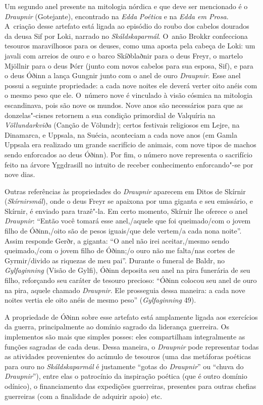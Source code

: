 Um segundo anel presente na mitologia nórdica e que deve ser mencionado
é o \emph{Draupnir} (Gotejante), encontrado na \emph{Edda}
\emph{Poética} e na \emph{Edda em Prosa}. A~criação desse artefato está
ligada ao episódio do roubo dos cabelos dourados da deusa Sif por Loki,
narrado no \emph{Skáldskaparmál}. O~anão Brokkr confecciona tesouros
maravilhosos para os deuses, como uma aposta pela cabeça de Loki: um
javali com arreios de ouro e o barco Skíðblaðnir para o deus Freyr, o
martelo Mjöllnir para o deus Þórr (junto com novos cabelos para sua
esposa, Sif), e para o deus Óðinn a lança Gungnir junto com o anel de
ouro \emph{Draupnir}. Esse anel possui a seguinte propriedade: a cada
nove noites ele deverá verter oito anéis com o mesmo peso que ele.
O~número nove é vinculado à visão cósmica na mitologia escandinava, pois
são nove os mundos. Nove anos são necessários para que as
donzelas"-cisnes retornem a sua condição primordial de Valquíria na
\emph{Völlundarkviða} (Canção de Völundr); certos festivais religiosos
em Lejre, na Dinamarca, e Uppsala, na Suécia, aconteciam a cada nove
anos (em Gamla Uppsala era realizado um grande sacrifício de animais,
com nove tipos de machos sendo enforcados ao deus Óðinn). Por fim, o
número nove representa o sacrifício feito na árvore Yggdrasill no
intuito de receber conhecimento enforcando"-se por nove dias.

Outras referências às propriedades do \emph{Draupnir} aparecem em Ditos
de Skírnir (\emph{Skírnirsmál}), onde o deus Freyr se apaixona por uma
giganta e seu emissário, e Skírnir, é enviado para trazê"-la. Em certo
momento, Skírnir lhe oferece o anel \emph{Draupnir}: ``Então você tomará
esse anel,/aquele que foi queimado/com o jovem filho de Óðinn,/oito são
de pesos iguais/que dele vertem/a cada nona noite''. Assim responde
Gerðr, a giganta: ``O anel não irei aceitar,/mesmo sendo queimado,/com o
jovem filho de Óðinn;/o ouro não me falta/nas cortes de Gyrmir/divido as
riquezas de meu pai''. Durante o funeral de Baldr, no
\emph{Gylfaginning} (Visão de Gylfi), Óðinn deposita seu anel na pira
funerária de seu filho, reforçando seu caráter de tesouro precioso:
``Óðinn colocou seu anel de ouro na pira, aquele chamado
\emph{Draupnir}. Ele prosseguia dessa maneira: a cada nove noites vertia
ele oito anéis de mesmo peso'' (\emph{Gylfaginning} 49).

A propriedade de Óðinn sobre esse artefato está amplamente ligada aos
exercícios da guerra, principalmente ao domínio sagrado da liderança
guerreira. Os implementos são mais que simples posses: eles compartilham
integralmente as funções sagradas de cada deus. Dessa maneira, o
\emph{Draupnir} pode representar todas as atividades provenientes do
acúmulo de tesouros (uma das metáforas poéticas para ouro no
\emph{Skáldskaparmál} é justamente ``gotas do \emph{Draupnir}'' ou
``chuva do \emph{Draupnir}''), entre elas o patrocínio da inspiração
poética (que é outro domínio odínico), o financiamento das expedições
guerreiras, presentes para outras chefias guerreiras (com a finalidade
de adquirir apoio) etc.

